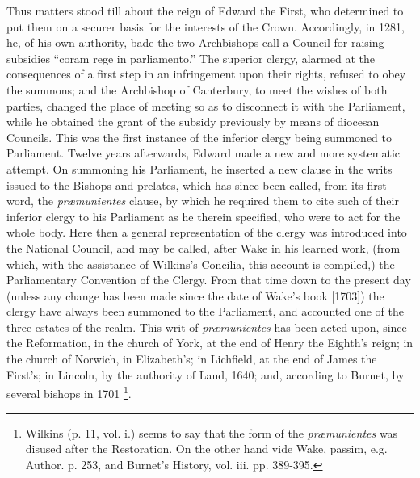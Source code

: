 Thus matters stood till about
the reign of Edward the First, who determined to put them on a securer
basis for the interests of the Crown. Accordingly, in 1281, he, of his
own authority, bade the two Archbishops call a Council for raising
subsidies ``coram rege in parliamento.'' The superior clergy, alarmed at
the consequences of a first step in an infringement upon their rights,
refused to obey the summons; and the Archbishop of Canterbury, to meet
the wishes of both parties, changed the place of meeting so as to
disconnect it with the Parliament, while he obtained the grant of the
subsidy previously by means of diocesan Councils. This was the first
instance of the inferior clergy being summoned to Parliament. Twelve
years afterwards, Edward made a new and more systematic attempt. On
summoning his Parliament, he inserted a new clause in the writs issued
to the Bishops and prelates, which has since been called, from its
first word, the \emph{præmunientes} clause, by which he required them
to cite such of their inferior clergy to his Parliament as he therein
specified, who were to act for the whole body. Here then a general
representation of the clergy was introduced into the National Council,
and may be called, after Wake in his learned work, (from which, with
the assistance of Wilkins's Concilia, this account is compiled,)
the Parliamentary Convention of the Clergy. From that time down to the
present day (unless any change has been made since the date of Wake's
book [1703]) the clergy have always been summoned to the Parliament,
and accounted one of the three estates of the realm. This writ of \emph{præmunientes}
has been acted upon, since the Reformation, in the church of York, at
the end of Henry the Eighth's reign; in the church of Norwich, in
Elizabeth's; in Lichfield, at the end of James the First's; in
Lincoln, by the authority of Laud, 1640; and, according to Burnet, by
several bishops in 1701 \footnote{

Wilkins (p. 11, vol. i.) seems
to say that the form of the \emph{præmunientes} was disused after the
Restoration. On the other hand vide Wake, passim, e.g. Author. p. 253,
and Burnet's History, vol. iii. pp. 389-395.}.

